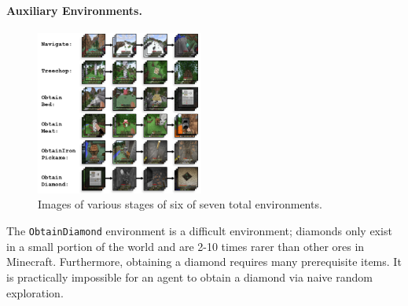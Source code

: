 \paragraph{Auxiliary Environments.}
\begin{figure}
    \begin{centering}
        \vspace{-10pt}
        \includegraphics[width=0.49\textwidth]{./assets/tasks_smaller.png} 
        \caption{\small Images of various stages of six of seven total environments.}
        \label{fig:tasks}
        \vspace{-10pt}
    \end{centering}
\end{figure}

The \texttt{ObtainDiamond} environment is a difficult environment; diamonds only exist in a small portion of the world and are 2-10 times rarer than other ores in Minecraft.
Furthermore, obtaining a diamond requires many prerequisite items. 
It is practically impossible for an agent to obtain a diamond via naive random exploration. 


